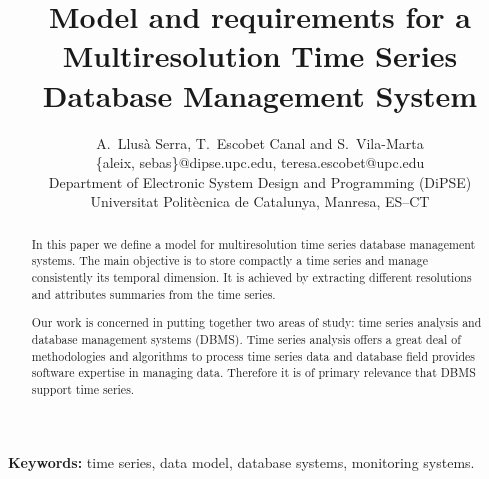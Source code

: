 \documentclass{scrartcl}
\title{%
  Model and requirements for a Multiresolution Time Series
  Database Management System }
\author
{
  {%
    A.\ Llusà Serra,
    T.\ Escobet Canal
    and S.\ Vila-Marta
  }\\
  {\{aleix, sebas\}@dipse.upc.edu, teresa.escobet@upc.edu}\\
  {Department of Electronic System Design and Programming (DiPSE)}\\
  {Universitat Politècnica de Catalunya, Manresa, ES--CT}
}
\begin{document}
\maketitle


\begin{abstract}
In this paper we define a model for multiresolution time series
database management systems. The main objective is to store compactly
a time series and manage consistently its temporal dimension. It is
achieved by extracting different resolutions and attributes summaries
from the time series.  

Our work is concerned in putting together two areas of study: time
series analysis and database management systems (DBMS). Time series analysis
offers a great deal of methodologies and algorithms to process time
series data and database field provides software expertise in managing
data. Therefore it is of primary relevance that DBMS support time series.
\end{abstract}

{\bfseries Keywords:} time series, data model, database systems,
monitoring systems.












\printbibliography{}
\end{document}
